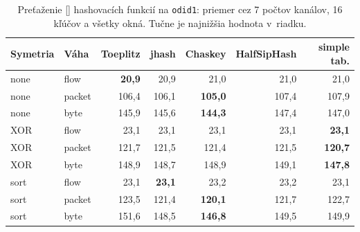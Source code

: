 \begin{table}[ht]
  \centering
  \small
  \caption{Preťaženie [\textperthousand] hashovacích funkcií na \texttt{odid1}: priemer cez 7 počtov kanálov, 16 kľúčov a všetky okná. Tučne je najnižšia hodnota v~riadku.}
  \label{tab:hashe-priemer}
  \begin{tabular}{l l rrrrr}
    \toprule
    Symetria & Váha & Toeplitz & jhash & Chaskey & HalfSipHash & simple tab. \\
    \midrule
    none & flow & \textbf{20,9} & 20,9 & 21,0 & 21,0 & 21,0 \\
    none & packet & 106,4 & 106,1 & \textbf{105,0} & 107,4 & 107,9 \\
    none & byte & 145,9 & 145,6 & \textbf{144,3} & 147,4 & 147,0 \\
    \midrule
    XOR & flow & 23,1 & 23,1 & 23,1 & 23,1 & \textbf{23,1} \\
    XOR & packet & 121,7 & 121,5 & 121,4 & 121,5 & \textbf{120,7} \\
    XOR & byte & 148,9 & 148,7 & 148,9 & 149,1 & \textbf{147,8} \\
    \midrule
    sort & flow & 23,1 & \textbf{23,1} & 23,2 & 23,2 & 23,1 \\
    sort & packet & 123,5 & 121,4 & \textbf{120,1} & 121,7 & 122,7 \\
    sort & byte & 151,6 & 148,5 & \textbf{146,8} & 149,5 & 149,9 \\
    \bottomrule
  \end{tabular}
\end{table}
